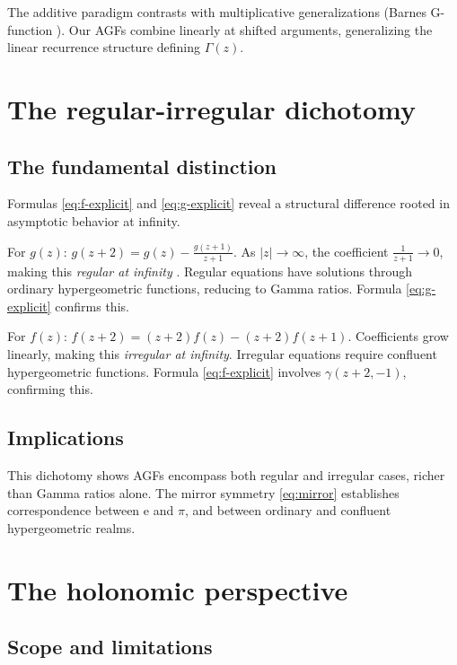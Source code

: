 \documentclass[11pt,reqno]{amsart}
\theoremstyle{definition}
\newcommand{\ee}{\mathrm{e}}
\numberwithin{equation}{section}
\begin{document}
The additive paradigm contrasts with multiplicative generalizations (Barnes G-function \cite{Barnes1901}). Our AGFs combine linearly at shifted arguments, generalizing the linear recurrence structure defining $\Gamma(z)$.

\section{The regular-irregular dichotomy}\label{sec:dichotomy}

\subsection{The fundamental distinction}

Formulas \eqref{eq:f-explicit} and \eqref{eq:g-explicit} reveal a structural difference rooted in asymptotic behavior at infinity.

For $g(z)$: $g(z+2) = g(z) - \frac{g(z+1)}{z+1}$. As $|z| \to \infty$, the coefficient $\frac{1}{z+1} \to 0$, making this \textit{regular at infinity} \cite{BirkhoffTrjitzinsky1933}. Regular equations have solutions through ordinary hypergeometric functions, reducing to Gamma ratios. Formula \eqref{eq:g-explicit} confirms this.

For $f(z)$: $f(z+2) = (z+2)f(z) - (z+2)f(z+1)$. Coefficients grow linearly, making this \textit{irregular at infinity}. Irregular equations require confluent hypergeometric functions. Formula \eqref{eq:f-explicit} involves $\gamma(z+2,-1)$, confirming this.

\subsection{Implications}

This dichotomy shows AGFs encompass both regular and irregular cases, richer than Gamma ratios alone. The mirror symmetry \eqref{eq:mirror} establishes correspondence between $\ee$ and $\pi$, and between ordinary and confluent hypergeometric realms.

\section{The holonomic perspective}\label{sec:holonomic}

\subsection{Scope and limitations}
\end{document}
